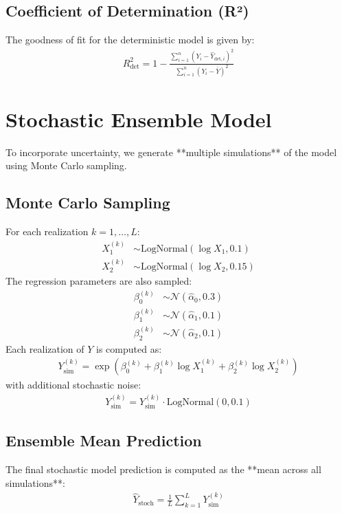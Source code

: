 \documentclass{article}
\begin{document}
\subsection{Coefficient of Determination (R²)}
The goodness of fit for the deterministic model is given by:
\begin{align}
    R^2_{\text{det}} = 1 - \frac{\sum_{i=1}^{n} (Y_i - \hat{Y}_{\text{det}, i})^2}{\sum_{i=1}^{n} (Y_i - \bar{Y})^2}
\end{align}

\section{Stochastic Ensemble Model}
To incorporate uncertainty, we generate **multiple simulations** of the model using Monte Carlo sampling.

\subsection{Monte Carlo Sampling}
For each realization $k = 1, \dots, L$:
\begin{align}
    X_1^{(k)} &\sim \text{LogNormal}(\log X_1, 0.1) \\
    X_2^{(k)} &\sim \text{LogNormal}(\log X_2, 0.15)
\end{align}
The regression parameters are also sampled:
\begin{align}
    \beta_0^{(k)} &\sim \mathcal{N}(\hat{\alpha}_0, 0.3) \\
    \beta_1^{(k)} &\sim \mathcal{N}(\hat{\alpha}_1, 0.1) \\
    \beta_2^{(k)} &\sim \mathcal{N}(\hat{\alpha}_2, 0.1)
\end{align}
Each realization of $Y$ is computed as:
\begin{align}
    Y_{\text{sim}}^{(k)} = \exp (\beta_0^{(k)} + \beta_1^{(k)} \log X_1^{(k)} + \beta_2^{(k)} \log X_2^{(k)})
\end{align}
with additional stochastic noise:
\begin{align}
    Y_{\text{sim}}^{(k)} = Y_{\text{sim}}^{(k)} \cdot \text{LogNormal}(0, 0.1)
\end{align}

\subsection{Ensemble Mean Prediction}
The final stochastic model prediction is computed as the **mean across all simulations**:
\begin{align}
    \hat{Y}_{\text{stoch}} = \frac{1}{L} \sum_{k=1}^{L} Y_{\text{sim}}^{(k)}
\end{align}
\end{document}
